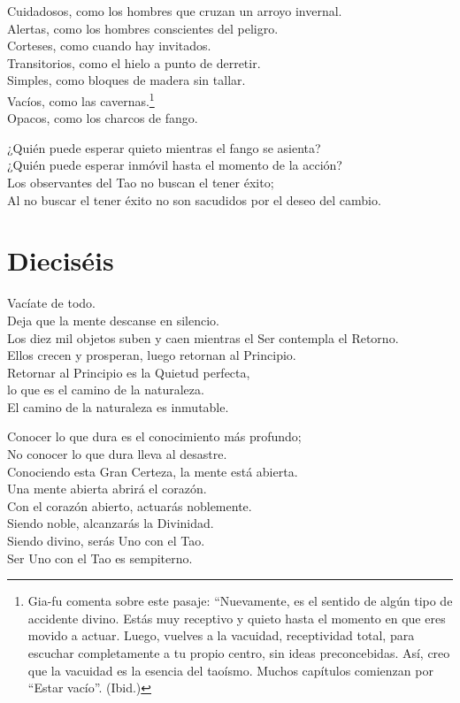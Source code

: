 \documentclass[book,b5paper,hidelinks,final]{memoir}
\begin{document}
	Cuidadosos, como los hombres que cruzan un arroyo invernal.\\
	Alertas, como los hombres conscientes del peligro.\\
	Corteses, como cuando hay invitados.\\
	Transitorios, como el hielo a punto de derretir.\\
	Simples, como bloques de madera sin tallar.\\
	Vacíos, como las cavernas.\footnote{Gia-fu comenta sobre este pasaje: ``Nuevamente, es el sentido de algún
		tipo de accidente divino. Estás muy receptivo y quieto hasta el momento
		en que eres movido a actuar. Luego, vuelves a la vacuidad, receptividad
		total, para escuchar completamente a tu propio centro, sin ideas
		preconcebidas. Así, creo que la vacuidad es la esencia del taoísmo.
		Muchos capítulos comienzan por ``Estar vacío''. (Ibid.)}\\
	Opacos, como los charcos de fango.
	
	¿Quién puede esperar quieto mientras el fango se asienta?\\
	¿Quién puede esperar inmóvil hasta el momento de la acción?\\
	Los observantes del Tao no buscan el tener éxito;\\
	Al no buscar el tener éxito no son sacudidos por el deseo del cambio.
	
	\chapter*{Dieciséis}
	
	Vacíate de todo.\\
	Deja que la mente descanse en silencio.\\
	Los diez mil objetos suben y caen mientras el Ser contempla el
	Retorno.\\
	Ellos crecen y prosperan, luego retornan al Principio.\\
	Retornar al Principio es la Quietud perfecta,\\
	lo que es el camino de la naturaleza.\\
	El camino de la naturaleza es inmutable.
	
	Conocer lo que dura es el conocimiento más profundo;\\
	No conocer lo que dura lleva al desastre.\\
	Conociendo esta Gran Certeza, la mente está abierta.\\
	Una mente abierta abrirá el corazón.\\
	Con el corazón abierto, actuarás noblemente.\\
	Siendo noble, alcanzarás la Divinidad.\\
	Siendo divino, serás Uno con el Tao.\\
	Ser Uno con el Tao es sempiterno.
	
\end{document}

